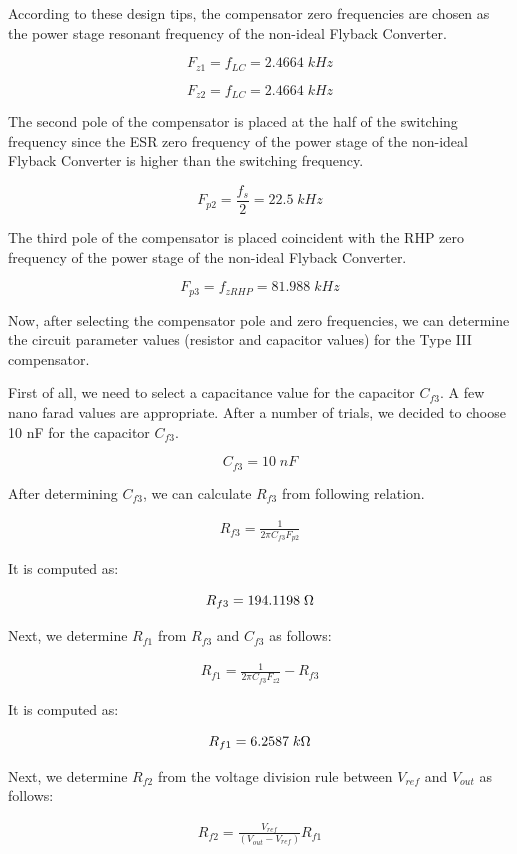 According to these design tips, the compensator zero frequencies are chosen as the power stage resonant frequency of the non-ideal Flyback Converter.

$$ F_{z1} = f_{LC} = 2.4664\;kHz $$

$$ F_{z2} = f_{LC} = 2.4664\;kHz $$

The second pole of the compensator is placed at the half of the switching frequency since the ESR zero frequency of the power stage of the non-ideal Flyback Converter is higher than the switching frequency.

$$ F_{p2} = \frac{f_s}{2} = 22.5\;kHz $$

The third pole of the compensator is placed coincident with the RHP zero frequency of the power stage of the non-ideal Flyback Converter.

$$ F_{p3} = f_{zRHP} = 81.988\;kHz $$

Now, after selecting the compensator pole and zero frequencies, we can determine the circuit parameter values (resistor and capacitor values) for the Type III compensator.

First of all, we need to select a capacitance value for the capacitor $C_{f3}$. A few nano farad values are appropriate. After a number of trials, we decided to choose 10 nF for the capacitor $C_{f3}$.

$$ C_{f3} = 10\; nF $$

After determining $C_{f3}$, we can calculate $R_{f3}$ from following relation.

\begin{align}
    R_{f3} = \frac{1}{2\pi C_{f3}F_{p2}}
\end{align}

It is computed as:

$$ R_{f3} = 194.1198\;\ohm $$

Next, we determine $R_{f1}$ from $R_{f3}$ and $C_{f3}$ as follows:

\begin{align}
    R_{f1} = \frac{1}{2\pi C_{f3}F_{z2}} - R_{f3}
\end{align}

It is computed as:

$$ R_{f1} = 6.2587\;k\ohm $$

Next, we determine $R_{f2}$ from the voltage division rule between $V_{ref}$ and $V_{out}$ as follows:

\begin{align}
    R_{f2} = \frac{V_{ref}}{(V_{out}-V_{ref})}R_{f1}
\end{align}

